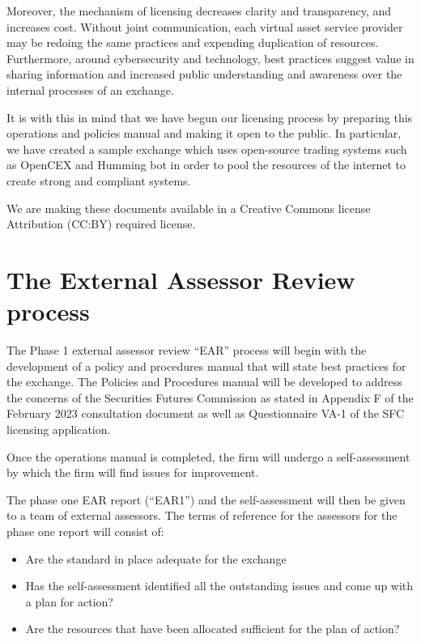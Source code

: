 Moreover, the mechanism of licensing decreases clarity and
transparency, and increases cost.  Without joint communication, each
virtual asset service provider may be redoing the same practices and
expending duplication of resources.  Furthermore, around
cybersecurity and technology, best practices suggest value in sharing
information and increased public understanding and awareness over the
internal processes of an exchange.

It is with this in mind that we have begun our licensing process by
preparing this operations and policies manual and making it open to
the public.  In particular, we have created a sample exchange which
uses open-source trading systems such as OpenCEX and Humming bot in
order to pool the resources of the internet to create strong and
compliant systems.

We are making these documents available in a Creative Commons license
Attribution (CC:BY) required license.

\section{The External Assessor Review process}

The Phase 1 external assessor review ``EAR'' process will begin with
the development of a policy and procedures manual that will state best
practices for the exchange.  The Policies and Procedures manual will
be developed to address the concerns of the Securities Futures
Commission as stated in Appendix F of the February 2023 consultation
document as well as Questionnaire VA-1 of the SFC licensing
application.

Once the operations manual is completed, the firm will undergo a
self-assessment by which the firm will find issues for improvement.

The phase one EAR report (``EAR1'') and the self-assessment will then
be given to a team of external assessors.  The terms of reference for
the assessors for the phase one report will consist of:

\begin{itemize}
\item Are the standard in place adequate for the exchange
  \item Has the self-assessment identified all the outstanding
    issues and come up with a plan for action?
  \item Are the resources that have been allocated sufficient for the
    plan of action?
\end{itemize}

